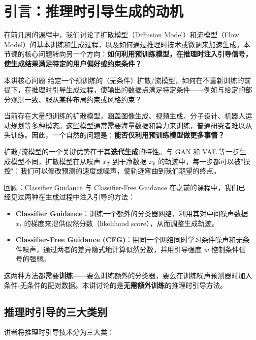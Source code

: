 \section{引言：推理时引导生成的动机}

在前几周的课程中，我们讨论了扩散模型（Diffusion Model）和流模型（Flow Model）的基本训练和生成过程，以及如何通过推理时技术或微调来加速生成。本节课的核心问题转向另一个方向：\textbf{如何利用预训练模型，在推理时注入引导信号，使生成结果满足特定的用户偏好或约束条件？}

\begin{importantbox}{本讲核心问题}
给定一个预训练的（无条件）扩散/流模型，如何在不重新训练的前提下，在推理时引导生成过程，使输出的数据点满足特定条件——例如与给定的部分观测一致、服从某种布局约束或风格约束？
\end{importantbox}

当前存在大量预训练的扩散模型，涵盖图像生成、视频生成、分子设计、机器人运动规划等多种模态。这些模型通常需要海量数据和算力来训练，普通研究者难以从头训练。因此，一个自然的问题是：\textbf{能否仅利用预训练模型做更多事情？}

扩散/流模型的一个关键优势在于其\textbf{迭代生成}的特性。与 GAN 和 VAE 等一步生成模型不同，扩散模型在从噪声 $x_T$ 到干净数据 $x_0$ 的轨迹中，每一步都可以被"操控"：我们可以修改预测的速度或噪声，使轨迹弯曲到我们期望的终点。

\begin{knowledgebox}{回顾：Classifier Guidance 与 Classifier-Free Guidance}
在之前的课程中，我们已经见过两种在生成过程中注入引导的方法：
\begin{itemize}
    \item \textbf{Classifier Guidance}：训练一个额外的分类器网络，利用其对中间噪声数据 $x_t$ 的梯度来提供似然分数（likelihood score），从而调整生成轨迹。
    \item \textbf{Classifier-Free Guidance (CFG)}：用同一个网络同时学习条件噪声和无条件噪声，通过两者的差异隐式地计算似然分数，并用引导强度 $w$ 控制条件信号的强弱。
\end{itemize}
这两种方法都需要\textbf{训练}——要么训练额外的分类器，要么在训练噪声预测器时加入条件-无条件的配对数据。本讲讨论的是\textbf{无需额外训练}的推理时引导方法。
\end{knowledgebox}

\subsection{推理时引导的三大类别}

讲者将推理时引导技术分为三大类：

